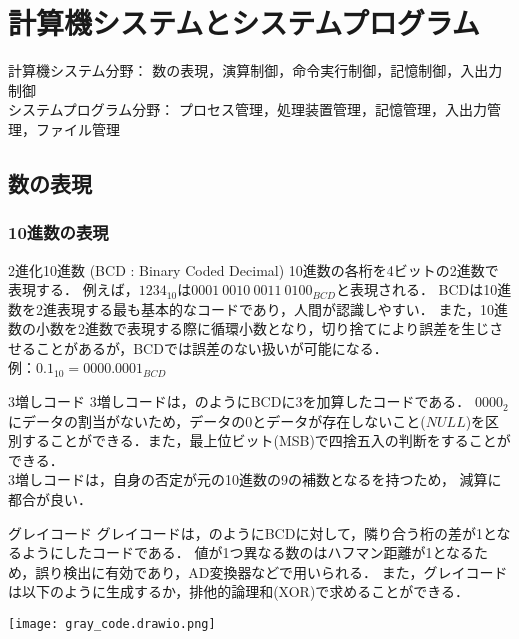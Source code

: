 \chapter{計算機システムとシステムプログラム}
計算機システム分野：
数の表現，演算制御，命令実行制御，記憶制御，入出力制御\\
システムプログラム分野：
プロセス管理，処理装置管理，記憶管理，入出力管理，ファイル管理

\section{数の表現}

\subsection{10進数の表現}

\begin{defbox}{2進化10進数 (BCD : Binary Coded Decimal)}
    10進数の各桁を4ビットの2進数で表現する．
    例えば，$1234_{10}$は$0001\ 0010\ 0011\ 0100_{BCD}$と表現される．
    BCDは10進数を2進表現する最も基本的なコードであり，人間が認識しやすい．
    また，10進数の小数を2進数で表現する際に循環小数となり，切り捨てにより誤差を生じさせることがあるが，BCDでは誤差のない扱いが可能になる．\\
    例：$0.1_{10} = 0000.0001_{BCD}$
\end{defbox}

\begin{defbox}{3増しコード}
    3増しコードは，のようにBCDに3を加算したコードである．
    $0000_2$にデータの割当がないため，データの$0$とデータが存在しないこと($NULL$)を区別することができる．また，最上位ビット(MSB)で四捨五入の判断をすることができる．\\
    3増しコードは，自身の否定が元の10進数の9の補数となるを持つため，
    減算に都合が良い．
\end{defbox}

\begin{defbox}{グレイコード}
    グレイコードは，のようにBCDに対して，隣り合う桁の差が1となるようにしたコードである．
    値が1つ異なる数のはハフマン距離が1となるため，誤り検出に有効であり，AD変換器などで用いられる．
    また，グレイコードは以下のように生成するか，排他的論理和(XOR)で求めることができる．
    \begin{center}
        \texttt{[image: gray\_code.drawio.png]}
    \end{center}
\end{defbox}

